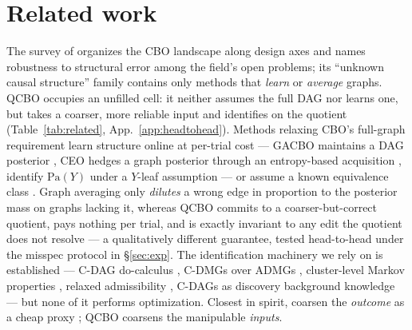 \documentclass[twoside]{article}
\newcommand{\Pa}{\mathrm{Pa}}
\newcommand{\QCBO}{\textsc{QCBO}}
\newcommand{\CBO}{\textsc{CBO}}
\newcommand{\CEO}{\textsc{CEO}}
\begin{document}
\section{Related work}
\label{sec:related}
The survey of \citet{anonymous2026cbobench} organizes the \CBO{} landscape along design axes and names robustness to structural error among the field's open problems; its ``unknown causal structure'' family contains only methods that \emph{learn} or \emph{average} graphs. \QCBO{} occupies an unfilled cell: it neither assumes the full DAG nor learns one, but takes a coarser, more reliable input and identifies on the quotient (Table~\ref{tab:related}, App.~\ref{app:headtohead}). Methods relaxing \CBO{}'s full-graph requirement learn structure online at per-trial cost --- GACBO maintains a DAG posterior \citep{mukherjee2024gacbo}, \CEO{} hedges a graph posterior through an entropy-based acquisition \citep{branchini2023ceo}, \citet{durand2025unknown} identify $\Pa(Y)$ under a $Y$-leaf assumption --- or assume a known equivalence class \citep{park2025dmis}. Graph averaging only \emph{dilutes} a wrong edge in proportion to the posterior mass on graphs lacking it, whereas \QCBO{} commits to a coarser-but-correct quotient, pays nothing per trial, and is exactly invariant to any edit the quotient does not resolve --- a qualitatively different guarantee, tested head-to-head under the misspec protocol in \S\ref{sec:exp}. The identification machinery we rely on is established --- C-DAG do-calculus \citep{anand2023cdag}, C-DMGs over ADMGs \citep{ferreira2025cdmg}, cluster-level Markov properties \citep{wahl2024foundations}, relaxed admissibility \citep{yvernes2025relaxing}, C-DAGs as discovery background knowledge \citep{ruizdevargas2025cdags} --- but none of it performs optimization. Closest in spirit, \citet{zeitler2025mfacbo} coarsen the \emph{outcome} as a cheap proxy \citep{poloczek2017multi,beckers2019approximate}; \QCBO{} coarsens the manipulable \emph{inputs}.

\end{document}
